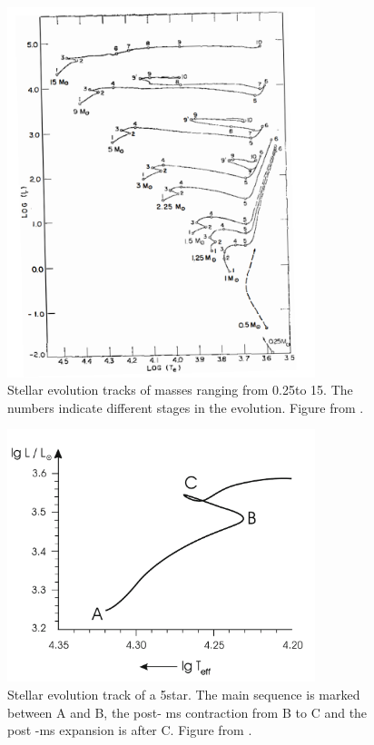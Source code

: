 \begin{figure}[htbp]
    \centering
    \includegraphics[width=0.8\textwidth]{iben.png}
    \caption{\citep{kippenhahn1990stellar} Stellar evolution tracks of masses ranging from 0.25\msun to 15\msun. The numbers indicate different stages in the evolution. Figure from \citet{iben1967stellar}.}
    \label{stages}
\end{figure}

\begin{figure}[htbp]
	\centering
	\includegraphics[width=0.8\textwidth]{STAGES.png}
	\caption{\citep{kippenhahn1990stellar} Stellar evolution track of a 5\msun star. The main sequence is marked between A and B, the post- ms contraction from B to C and the post -ms expansion is after C. Figure from \citep{kippenhahn1990stellar}.}
	\label{stages2}
\end{figure}

